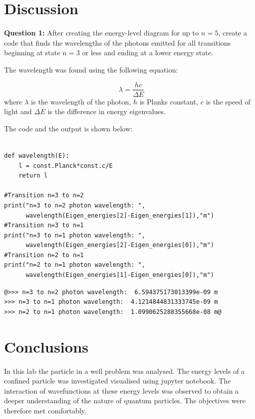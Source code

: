 \section{Discussion}
\textbf{Question 1:}
After creating the energy-level diagram for up to $n=5$, create a code that finds the wavelengths of the photons emitted for all transitions beginning at state $n=3$ or less and ending at a lower energy state.

The wavelength was found using the following equation:

\[\lambda = \frac{hc}{\Delta E}\]
where $\lambda$ is the wavelength of the photon, $h$ is Planks constant, $c$ is the speed of light and $\Delta E$ is the difference in energy eigenvalues.

The code and the output is shown below:

\begin{listing}[H]
\begin{verbatim}

def wavelength(E):
    l = const.Planck*const.c/E
    return l

#Transition n=3 to n=2
print("n=3 to n=2 photon wavelength: ", 
      wavelength(Eigen_energies[2]-Eigen_energies[1]),"m")
#Transition n=3 to n=1
print("n=3 to n=1 photon wavelength: ", 
      wavelength(Eigen_energies[2]-Eigen_energies[0]),"m")
#Transition n=2 to n=1
print("n=2 to n=1 photon wavelength: ", 
      wavelength(Eigen_energies[1]-Eigen_energies[0]),"m")
\end{verbatim}
\end{listing}

\begin{lstlisting}[frame=single,style=base,backgroundcolor=\color{black}, basicstyle=\small]
@>>> n=3 to n=2 photon wavelength:  6.594375173013399e-09 m
>>> n=3 to n=1 photon wavelength:  4.1214844831333745e-09 m
>>> n=2 to n=1 photon wavelength:  1.0990625288355668e-08 m@
\end{lstlisting}


\section{Conclusions}
In this lab the particle in a well problem was analysed. The energy levels of a confined particle was investigated visualised using jupyter notebook. The interaction of wavefunctions at these energy levels was observed to obtain a deeper understanding of the nature of quantum particles. The objectives were therefore met comfortably.